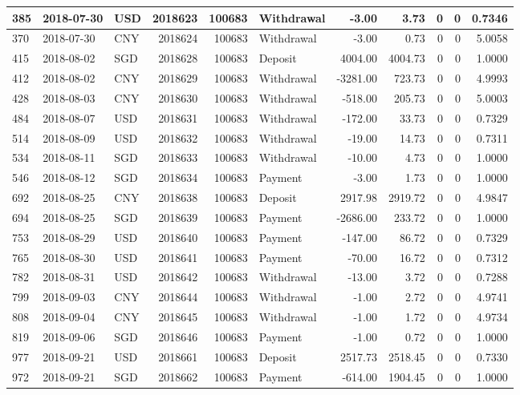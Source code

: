 \documentclass[]{article}
\begin{document}
\begin{table}[H]
\begin{tabular}{l|l|l|r|r|l|r|r|r|r|r}
\hline
385 & 2018-07-30 & USD & 2018623 & 100683 & Withdrawal & -3.00 & 3.73 & 0 & 0 & 0.7346\\
\hline
370 & 2018-07-30 & CNY & 2018624 & 100683 & Withdrawal & -3.00 & 0.73 & 0 & 0 & 5.0058\\
\hline
415 & 2018-08-02 & SGD & 2018628 & 100683 & Deposit & 4004.00 & 4004.73 & 0 & 0 & 1.0000\\
\hline
412 & 2018-08-02 & CNY & 2018629 & 100683 & Withdrawal & -3281.00 & 723.73 & 0 & 0 & 4.9993\\
\hline
428 & 2018-08-03 & CNY & 2018630 & 100683 & Withdrawal & -518.00 & 205.73 & 0 & 0 & 5.0003\\
\hline
484 & 2018-08-07 & USD & 2018631 & 100683 & Withdrawal & -172.00 & 33.73 & 0 & 0 & 0.7329\\
\hline
514 & 2018-08-09 & USD & 2018632 & 100683 & Withdrawal & -19.00 & 14.73 & 0 & 0 & 0.7311\\
\hline
534 & 2018-08-11 & SGD & 2018633 & 100683 & Withdrawal & -10.00 & 4.73 & 0 & 0 & 1.0000\\
\hline
546 & 2018-08-12 & SGD & 2018634 & 100683 & Payment & -3.00 & 1.73 & 0 & 0 & 1.0000\\
\hline
692 & 2018-08-25 & CNY & 2018638 & 100683 & Deposit & 2917.98 & 2919.72 & 0 & 0 & 4.9847\\
\hline
694 & 2018-08-25 & SGD & 2018639 & 100683 & Payment & -2686.00 & 233.72 & 0 & 0 & 1.0000\\
\hline
753 & 2018-08-29 & USD & 2018640 & 100683 & Payment & -147.00 & 86.72 & 0 & 0 & 0.7329\\
\hline
765 & 2018-08-30 & USD & 2018641 & 100683 & Payment & -70.00 & 16.72 & 0 & 0 & 0.7312\\
\hline
782 & 2018-08-31 & USD & 2018642 & 100683 & Withdrawal & -13.00 & 3.72 & 0 & 0 & 0.7288\\
\hline
799 & 2018-09-03 & CNY & 2018644 & 100683 & Withdrawal & -1.00 & 2.72 & 0 & 0 & 4.9741\\
\hline
808 & 2018-09-04 & CNY & 2018645 & 100683 & Withdrawal & -1.00 & 1.72 & 0 & 0 & 4.9734\\
\hline
819 & 2018-09-06 & SGD & 2018646 & 100683 & Payment & -1.00 & 0.72 & 0 & 0 & 1.0000\\
\hline
977 & 2018-09-21 & USD & 2018661 & 100683 & Deposit & 2517.73 & 2518.45 & 0 & 0 & 0.7330\\
\hline
972 & 2018-09-21 & SGD & 2018662 & 100683 & Payment & -614.00 & 1904.45 & 0 & 0 & 1.0000\\

\end{tabular}
\end{table}
\end{document}

